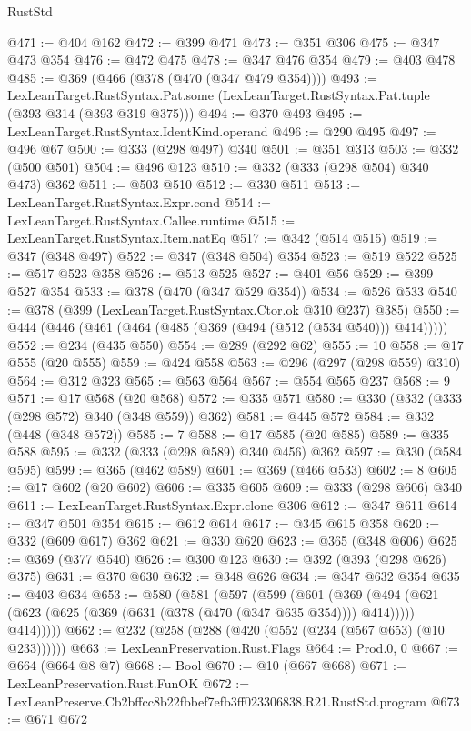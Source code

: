 \begin{lexlean}{RustStd}
\begin{coremodule}
@471 := @404 @162
@472 := @399 @471
@473 := @351 @306
@475 := @347 @473 @354
@476 := @472 @475
@478 := @347 @476 @354
@479 := @403 @478
@485 := @369 (@466 (@378 (@470 (@347 @479 @354))))
@493 := LexLeanTarget.RustSyntax.Pat.some
    (LexLeanTarget.RustSyntax.Pat.tuple (@393 @314 (@393 @319 @375)))
@494 := @370 @493
@495 := LexLeanTarget.RustSyntax.IdentKind.operand
@496 := @290 @495
@497 := @496 @67
@500 := @333 (@298 @497) @340
@501 := @351 @313
@503 := @332 (@500 @501)
@504 := @496 @123
@510 := @332 (@333 (@298 @504) @340 @473) @362
@511 := @503 @510
@512 := @330 @511
@513 := LexLeanTarget.RustSyntax.Expr.cond
@514 := LexLeanTarget.RustSyntax.Callee.runtime
@515 := LexLeanTarget.RustSyntax.Item.natEq
@517 := @342 (@514 @515)
@519 := @347 (@348 @497)
@522 := @347 (@348 @504) @354
@523 := @519 @522
@525 := @517 @523 @358
@526 := @513 @525
@527 := @401 @56
@529 := @399 @527 @354
@533 := @378 (@470 (@347 @529 @354))
@534 := @526 @533
@540 := @378 (@399 (LexLeanTarget.RustSyntax.Ctor.ok @310 @237) @385)
@550 := @444 (@446 (@461 (@464 (@485 (@369 (@494 (@512 (@534 @540))) @414)))))
@552 := @234 (@435 @550)
@554 := @289 (@292 @62)
@555 := 10
@558 := @17 @555 (@20 @555)
@559 := @424 @558
@563 := @296 (@297 (@298 @559) @310)
@564 := @312 @323
@565 := @563 @564
@567 := @554 @565 @237
@568 := 9
@571 := @17 @568 (@20 @568)
@572 := @335 @571
@580 := @330 (@332 (@333 (@298 @572) @340 (@348 @559)) @362)
@581 := @445 @572
@584 := @332 (@448 (@348 @572))
@585 := 7
@588 := @17 @585 (@20 @585)
@589 := @335 @588
@595 := @332 (@333 (@298 @589) @340 @456) @362
@597 := @330 (@584 @595)
@599 := @365 (@462 @589)
@601 := @369 (@466 @533)
@602 := 8
@605 := @17 @602 (@20 @602)
@606 := @335 @605
@609 := @333 (@298 @606) @340
@611 := LexLeanTarget.RustSyntax.Expr.clone @306
@612 := @347 @611
@614 := @347 @501 @354
@615 := @612 @614
@617 := @345 @615 @358
@620 := @332 (@609 @617) @362
@621 := @330 @620
@623 := @365 (@348 @606)
@625 := @369 (@377 @540)
@626 := @300 @123
@630 := @392 (@393 (@298 @626) @375)
@631 := @370 @630
@632 := @348 @626
@634 := @347 @632 @354
@635 := @403 @634
@653 := @580
    (@581
      (@597
        (@599
          (@601
            (@369
              (@494 (@621 (@623 (@625 (@369 (@631 (@378 (@470 (@347 @635 @354)))) @414)))))
              @414)))))
@662 := @232 (@258 (@288 (@420 (@552 (@234 (@567 @653) (@10 @233))))))
@663 := LexLeanPreservation.Rust.Flags
@664 := Prod.{0, 0}
@667 := @664 (@664 @8 @7)
@668 := Bool
@670 := @10 (@667 @668)
@671 := LexLeanPreservation.Rust.FunOK
@672 := LexLeanPreserve.Cb2bffcc8b22fbbef7efb3ff023306838.R21.RustStd.program
@673 := @671 @672

\end{coremodule}
\end{lexlean}
